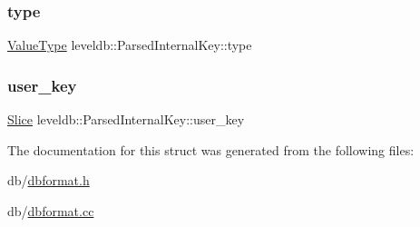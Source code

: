 \subsubsection{\texorpdfstring{type}{type}}
{\footnotesize\ttfamily \mbox{\hyperlink{namespaceleveldb_acc038cb0d608414730cafa459a4ba866}{Value\+Type}} leveldb\+::\+Parsed\+Internal\+Key\+::type}

\mbox{\label{structleveldb_1_1_parsed_internal_key_aa6e30fcf3c95fc1485d60fa08efe2b9d}} 
\subsubsection{\texorpdfstring{user\_key}{user\_key}}
{\footnotesize\ttfamily \mbox{\hyperlink{classleveldb_1_1_slice}{Slice}} leveldb\+::\+Parsed\+Internal\+Key\+::user\+\_\+key}



The documentation for this struct was generated from the following files\+:\begin{DoxyCompactItemize}
\item 
db/\mbox{\hyperlink{dbformat_8h}{dbformat.\+h}}\item 
db/\mbox{\hyperlink{dbformat_8cc}{dbformat.\+cc}}\end{DoxyCompactItemize}
